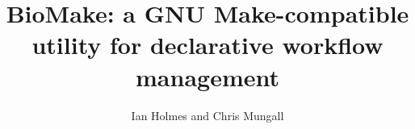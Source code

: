 \documentclass{article}
\begin{document}
\newcommand\structabs[5]{\maketitle \abstract{#1 #2 #3 Contact: #4}}

\title{BioMake: a GNU Make-compatible utility for declarative workflow management}
\author{Ian Holmes and Chris Mungall}


\end{document}
